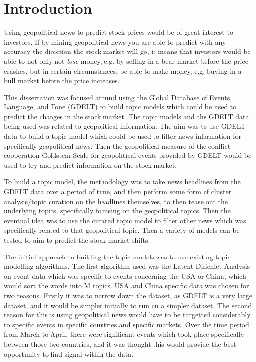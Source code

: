 \section{Introduction}
Using geopolitical news to predict stock prices would be of great interest to investors. If by mining geopolitical news you are able to predict with any accuracy the direction the stock market will go, it means that investors would be able to not only not \textit{lose} money, e.g. by selling in a bear market before the price crashes, but in certain circumstances, be able to make money, e.g. buying in a bull market before the price increases.

This dissertation was focused around using the Global Database of Events, Language, and Tone (GDELT) to build topic models which could be used to predict the changes in the stock market. The topic models and the GDELT data being used was related to geopolitical information. The aim was to use GDELT data to build a topic model which could be used to filter news information for specifically geopolitical news. Then the geopolitical measure of the conflict cooperation Goldstein Scale for geopolitical events provided by GDELT would be used to try and predict information on the stock market.

To build a topic model, the methodology was to take news headlines from the GDELT data over a period of time, and then perform some form of cluster analysis/topic curation on the headlines themselves, to then tease out the underlying topics, specifically focusing on the geopolitical topics. Then the eventual idea was to use the curated topic model to filter other news which was specifically related to that geopolitical topic. Then a variety of models can be tested to aim to predict the stock market shifts.

The initial approach to building the topic models was to use existing topic modelling algorithms. The first algorithm used was the Latent Dirichlet Analysis on event data which was specific to events concerning the USA or China, which would sort the words into M topics. USA and China specific data was chosen for two reasons. Firstly it was to narrow down the dataset, as GDELT is a very large dataset, and it would be simpler initially to run on a simpler dataset. The second reason for this is using geopolitical news would have to be targetted considerably to specific events in specific countries and specific markets. Over the time period from March to April, there were significant events which took place specifically between those two countries, and it was thought this would provide the best opportunity to find signal within the data. 

